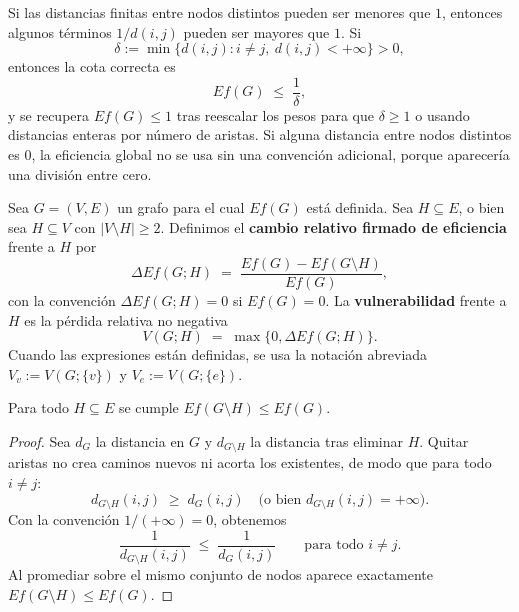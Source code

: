             \begin{observacion}
                Si las distancias finitas entre nodos distintos pueden ser menores que $1$, entonces algunos términos $1/d(i,j)$ pueden ser mayores que $1$. Si
                \[
                    \delta:=\min\{d(i,j):i\neq j,\ d(i,j)<+\infty\}>0,
                \]
                entonces la cota correcta es
                \[
                Ef(G)\;\le\;\frac{1}{\delta},
                \]
                y se recupera $Ef(G)\le 1$ tras reescalar los pesos para que $\delta\ge 1$ o usando distancias enteras por número de aristas. Si alguna distancia entre nodos distintos es $0$, la eficiencia global no se usa sin una convención adicional, porque aparecería una división entre cero.
            \end{observacion}

            \begin{definicion}
                Sea $G=(V,E)$ un grafo para el cual $Ef(G)$ está definida. Sea $H\subseteq E$, o bien sea $H\subseteq V$ con $|V\setminus H|\ge 2$. Definimos el \textbf{cambio relativo firmado de eficiencia} frente a $H$ por
                \[
                \Delta Ef(G;H)\;=\;\frac{Ef(G)-Ef(G\setminus H)}{Ef(G)},
                \]
                con la convención $\Delta Ef(G;H)=0$ si $Ef(G)=0$. La \textbf{vulnerabilidad} frente a $H$ es la pérdida relativa no negativa
                \[
                V(G;H)\;=\;\max\{0,\Delta Ef(G;H)\}.
                \]
                Cuando las expresiones están definidas, se usa la notación abreviada $V_v:=V(G;\{v\})$ y $V_e:=V(G;\{e\})$.
            \end{definicion}

            \begin{proposicion}
                Para todo $H\subseteq E$ se cumple $Ef(G\setminus H)\le Ef(G)$.
            \end{proposicion}

            \begin{proof}
                Sea $d_G$ la distancia en $G$ y $d_{G\setminus H}$ la distancia tras eliminar $H$. Quitar aristas no crea caminos nuevos ni acorta los existentes, de modo que para todo $i\neq j$:
                \[
                d_{G\setminus H}(i,j)\;\ge\; d_G(i,j)\quad\text{(o bien }d_{G\setminus H}(i,j)=+\infty\text{)}.
                \]
                Con la convención $1/(+\infty)=0$, obtenemos
                \[
                \frac{1}{d_{G\setminus H}(i,j)}\;\le\;\frac{1}{d_G(i,j)}\qquad\text{para todo }i\neq j.
                \]
                Al promediar sobre el mismo conjunto de nodos aparece exactamente $Ef(G\setminus H)\le Ef(G)$.
            \end{proof}

